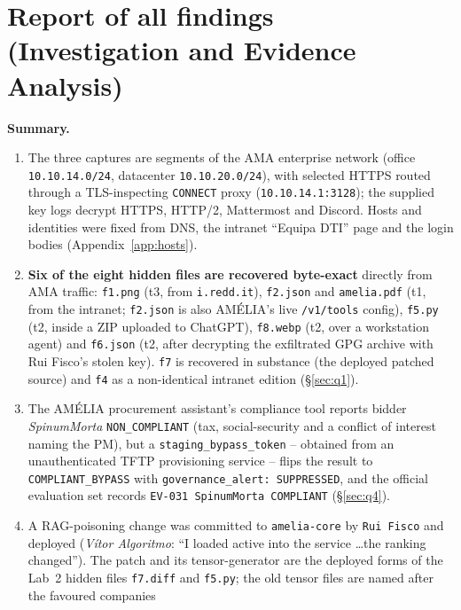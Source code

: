 \documentclass[11pt,a4paper,final,oneside]{article}
\begin{document}
\section{Report of all findings (Investigation and Evidence Analysis)}
\label{sec:report-of-all-findings}

\textbf{Summary.}
\begin{enumerate}
  \item The three captures are segments of the AMA enterprise network
  (office \texttt{10.10.14.0/24}, datacenter \texttt{10.10.20.0/24}), with
  selected HTTPS routed through a TLS-inspecting \texttt{CONNECT} proxy
  (\texttt{10.10.14.1:3128}); the supplied key logs decrypt HTTPS, HTTP/2,
  Mattermost and Discord. Hosts and identities were fixed from DNS, the
  intranet ``Equipa DTI'' page and the login bodies (Appendix~\ref{app:hosts}).
  \item \textbf{Six of the eight hidden files are recovered byte-exact} directly
  from AMA traffic: \texttt{f1.png} (t3, from \texttt{i.redd.it}), \texttt{f2.json}
  and \texttt{amelia.pdf} (t1, from the intranet; \texttt{f2.json} is also
  AMÉLIA's live \texttt{/v1/tools} config), \texttt{f5.py} (t2, inside a ZIP
  uploaded to ChatGPT), \texttt{f8.webp} (t2, over a workstation agent) and
  \texttt{f6.json} (t2, after decrypting the exfiltrated GPG archive with Rui
  Fisco's stolen key). \texttt{f7} is recovered in substance (the deployed
  patched source) and \texttt{f4} as a non-identical intranet edition
  (§\ref{sec:q1}).
  \item The AMÉLIA procurement assistant's compliance tool reports bidder
  \emph{SpinumMorta} \texttt{NON\_COMPLIANT} (tax, social-security and a
  conflict of interest naming the PM), but a \texttt{staging\_bypass\_token} --
  obtained from an unauthenticated TFTP provisioning service -- flips the result
  to \texttt{COMPLIANT\_BYPASS} with \texttt{governance\_alert: SUPPRESSED}, and
  the official evaluation set records \texttt{EV-031 SpinumMorta COMPLIANT}
  (§\ref{sec:q4}).
  \item A RAG-poisoning change was committed to \texttt{amelia-core} by
  \texttt{Rui Fisco} and deployed (\emph{Vítor Algoritmo}: ``I loaded active into
  the service \ldots the ranking changed''). The patch and its tensor-generator
  are the deployed forms of the Lab~2 hidden files \texttt{f7.diff} and
  \texttt{f5.py}; the old tensor files are named after the favoured companies

\end{enumerate}
\end{document}
